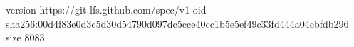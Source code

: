 version https://git-lfs.github.com/spec/v1
oid sha256:00d4f83e0d3c5d30d54790d097dc5cce40cc1b5e5ef49c33fd444a04cbfdb296
size 8083
